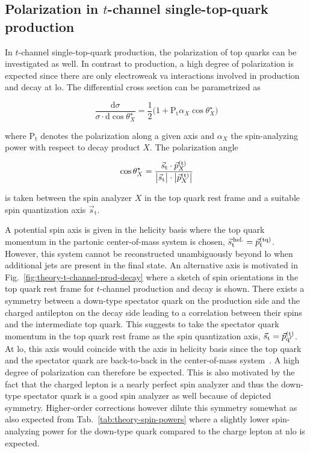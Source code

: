 \subsection{Polarization in $t$-channel single-top-quark production}

In $t$-channel single-top-quark production, the polarization of top quarks can be investigated as well. In contrast to \ttbar production, a high degree of polarization is expected since there are only electroweak \gls{va} interactions involved in production and decay at \gls{lo}. The differential cross section can be parametrized as

\begin{equation}
\frac{\mathrm{d}\sigma}{\sigma\cdot\mathrm{d}\cos\theta^\star_{X}}=\frac{1}{2}\big(1+\mathrm{P}_\mathrm{t}\alpha_{X}\cos\theta^\star_{X}\big)
\end{equation}

where $\mathrm{P}_\mathrm{t}$ denotes the polarization along a given axis and $\alpha_{X}$ the spin-analyzing power with respect to decay product $X$. The polarization angle

\begin{equation}
\cos\theta^\star_{X}=\frac{\vec{s}_\mathrm{t}\cdot \vec{p}_{X}^\scriptn{\mathrm{(t)}}}{\big|\vec{s}_\mathrm{t}\big|\cdot\big|\vec{p}_{X}^\scriptn{\mathrm{(t)}}\big|}
\end{equation}

is taken between the spin analyzer $X$ in the top quark rest frame and a suitable spin quantization axis $\vec{s}_\mathrm{t}$. 

A potential spin axis is given in the helicity basis where the top quark momentum in the partonic center-of-mass system is chosen, $\vec{s}_\mathrm{t}^\scriptn{\,\mathrm{hel.}}=\vec{p}_\mathrm{t}^\scriptn{\mathrm{(tq)}}$. However, this system cannot be reconstructed unambiguously beyond \gls{lo} when additional jets are present in the final state. An alternative axis is motivated in Fig.~\ref{fig:theory-t-channel-prod-decay} where a sketch of spin orientations in the top quark rest frame for $t$-channel production and decay is shown. There exists a symmetry between a down-type spectator quark on the production side and the charged antilepton on the decay side leading to a correlation between their spins and the intermediate top quark. This suggests to take the spectator quark momentum in the top quark rest frame as the spin quantization axis, $\vec{s}_\mathrm{t}=\vec{p}_{\mathrm{q}^\prime}^\scriptn{\mathrm{(t)}}$. At \gls{lo}, this axis would coincide with the axis in helicity basis since the top quark and the spectator quark are back-to-back in the center-of-mass system~\cite{Schwienhorst:2010je}. A high degree of polarization can therefore be expected. This is also motivated by the fact that the charged lepton is a nearly perfect spin analyzer and thus the down-type spectator quark is a good spin analyzer as well because of depicted symmetry. Higher-order corrections however dilute this symmetry somewhat as also expected from Tab.~\ref{tab:theory-spin-powers} where a slightly lower spin-analyzing power for the down-type quark compared to the charge lepton at \gls{nlo} is expected. 

